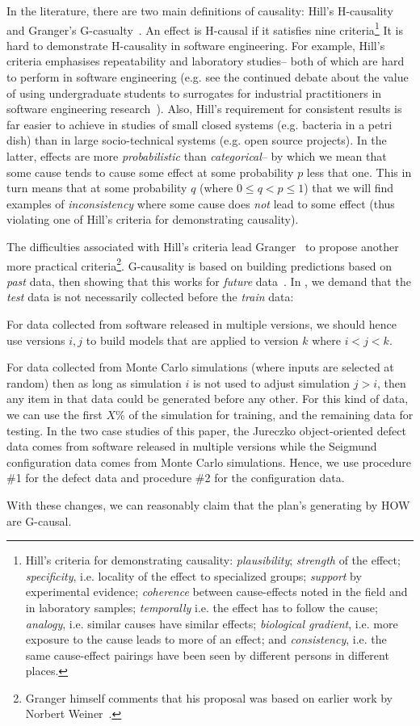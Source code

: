 In the literature, there are two main definitions of causality: Hill's H-causality~\cite{Hill1965}
and Granger's G-casualty~\cite{granger80}. 
An effect
is H-causal if it satisfies nine criteria\footnote{Hill's criteria for
demonstrating causality:
{\em  plausibility};
{\em strength} of the effect;
{\em 
specificity}, i.e. locality of the effect
to specialized groups;
{\em
support} by experimental evidence;
{\em 
coherence} between cause-effects noted
in the field and in laboratory samples;
{\em
temporally} i.e. the effect has to follow the cause;
{\em 
analogy}, i.e.  similar causes have similar effects;
{\em
biological gradient}, i.e.  more exposure to the cause leads to more of an
effect; and
{\em
consistency}, i.e.  the same cause-effect pairings have been seen by different persons
in different places.}
It is hard to demonstrate H-causality in software engineering.
For example, Hill's criteria emphasises repeatability and laboratory studies-- both of which are
hard to perform in software engineering (e.g. see the continued debate about
the value of using undergraduate students to surrogates for industrial
practitioners in software engineering research~\cite{Carver2003}). Also, Hill's requirement
for consistent results is far easier to achieve in studies of small closed systems (e.g. bacteria in a petri dish)
than in large socio-technical systems (e.g. open source projects). In the latter,
effects are more {\em probabilistic} than {\em categorical}-- by which we mean that 
some cause tends to cause some effect at some probability $p$ less that one.
This in turn means that at some probability $q$ (where $0 \le q < p \le 1$)
that we will find examples of {\em inconsistency} where some cause does {\em not} lead
to some effect (thus violating one of Hill's criteria for demonstrating causality).

The  difficulties associated with Hill's criteria lead Granger~\cite{granger80}
to propose another more practical criteria\footnote{Granger  himself comments that
his proposal was based on earlier work by Norbert Weiner~\cite{Seth2007}.}.
\mbox{G-causality} is based on building predictions based on {\em past} data,
then showing that this works for {\em future} data~\cite{granger80}. 
 In  , we demand that the {\em test}
data is not necessarily collected before the {\em train} data:
\bi
\item[\#1:] For data collected from software released in multiple versions, we should hence use  versions  $i,j$ to build models that are applied to version  $k$ where $i<j<k$.
\item[\#2:] For data collected from Monte Carlo simulations (where inputs are selected at random)
then as long as simulation $i$ is not used to adjust simulation $j> i$, then any item in that
data could be generated before any other. For this kind of data, we  can use the first $X\%$
of the simulation for training, and the remaining data for testing.
\ee
In the two case studies of this paper, the Jureczko object-oriented defect data comes from software
released in multiple versions while the Seigmund configuration data comes from Monte Carlo simulations.
Hence, we use procedure \#1 for the defect data and procedure \#2 for the configuration data.

With these changes,
we can reasonably claim that the plan's generating by HOW are G-causal.